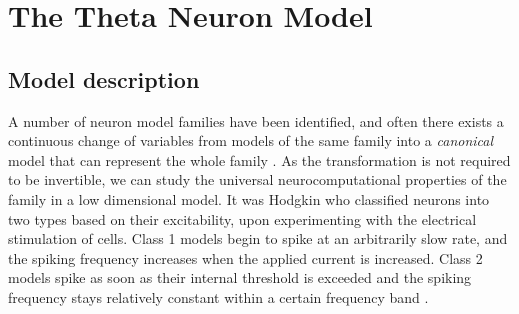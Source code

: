 \newpage
\section{The Theta Neuron Model} \label{TheThetaNeuronModel}


\subsection{Model description}
A number of neuron model families have been identified, and often there exists a continuous change of variables from models of the same family into a \textit{canonical} model that can represent the whole family \cite{Hoppensteadt2001CanonicalNM}. As the transformation is not required to be invertible, we can study the universal neurocomputational properties of the family in a low dimensional model.
It was Hodgkin \cite{Hodgkin1948} who classified neurons into two types based on their excitability, upon experimenting with the electrical stimulation of cells. Class 1 models begin to spike at an arbitrarily slow rate, and the spiking frequency increases when the applied current is increased. Class 2 models spike as soon as their internal threshold is exceeded and the spiking frequency stays relatively constant within a certain frequency band \cite{Hoppensteadt2001CanonicalNM}.

